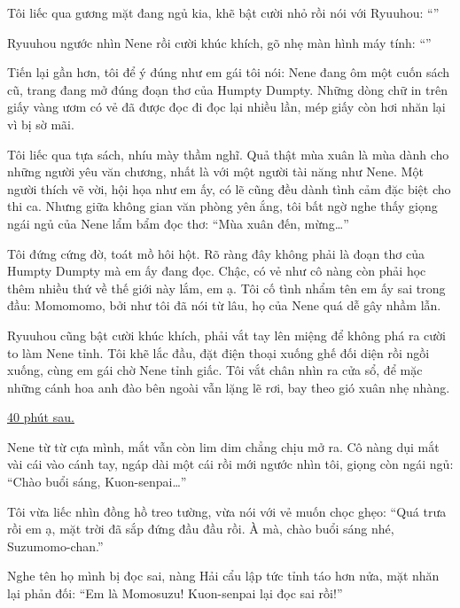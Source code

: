 \documentclass[../main.tex]{subfiles}
\begin{document}
Tôi liếc qua gương mặt đang ngủ kia, khẽ bật cười nhỏ rồi nói với Ryuuhou: ``''

Ryuuhou ngước nhìn Nene rồi cười khúc khích, gõ nhẹ màn hình máy tính: ``''

Tiến lại gần hơn, tôi để ý đúng như em gái tôi nói: Nene đang ôm một cuốn sách cũ, trang đang mở đúng đoạn thơ của Humpty Dumpty. Những dòng chữ in trên giấy vàng ươm có vẻ đã được đọc đi đọc lại nhiều lần, mép giấy còn hơi nhăn lại vì bị sờ mãi.


Tôi liếc qua tựa sách, nhíu mày thầm nghĩ. Quả thật mùa xuân là mùa dành cho những người yêu văn chương, nhất là với một người tài năng như Nene. Một người thích vẽ vời, hội họa như em ấy, có lẽ cũng đều dành tình cảm đặc biệt cho thi ca. Nhưng giữa không gian văn phòng yên ắng, tôi bất ngờ nghe thấy giọng ngái ngủ của Nene lẩm bẩm đọc thơ: ``Mùa xuân đến, mừng\dots''

Tôi đứng cứng đờ, toát mồ hôi hột. Rõ ràng đây không phải là đoạn thơ của Humpty Dumpty mà em ấy đang đọc. Chậc, có vẻ như cô nàng còn phải học thêm nhiều thứ về thế giới này lắm, em ạ. Tôi cố tình nhẩm tên em ấy sai trong đầu: Momomomo, bởi như tôi đã nói từ lâu, họ của Nene quá dễ gây nhầm lẫn.

Ryuuhou cũng bật cười khúc khích, phải vắt tay lên miệng để không phá ra cười to làm Nene tỉnh. Tôi khẽ lắc đầu, đặt điện thoại xuống ghế đối diện rồi ngồi xuống, cùng em gái chờ Nene tỉnh giấc. Tôi vắt chân nhìn ra cửa sổ, để mặc những cánh hoa anh đào bên ngoài vẫn lặng lẽ rơi, bay theo gió xuân nhẹ nhàng.

\begin{center}
  \uline{40 phút sau.}
\end{center}

Nene từ từ cựa mình, mắt vẫn còn lim dim chẳng chịu mở ra. Cô nàng dụi mắt vài cái vào cánh tay, ngáp dài một cái rồi mới ngước nhìn tôi, giọng còn ngái ngủ: ``Chào buổi sáng, Kuon-senpai\dots''

Tôi vừa liếc nhìn đồng hồ treo tường, vừa nói với vẻ muốn chọc ghẹo: ``Quá trưa rồi em ạ, mặt trời đã sắp đứng đầu đầu rồi. À mà, chào buổi sáng nhé, Suzumomo-chan.''

Nghe tên họ mình bị đọc sai, nàng Hải cẩu lập tức tỉnh táo hơn nửa, mặt nhăn lại phản đối: ``Em là Momosuzu! Kuon-senpai lại đọc sai rồi!''
\end{document}
